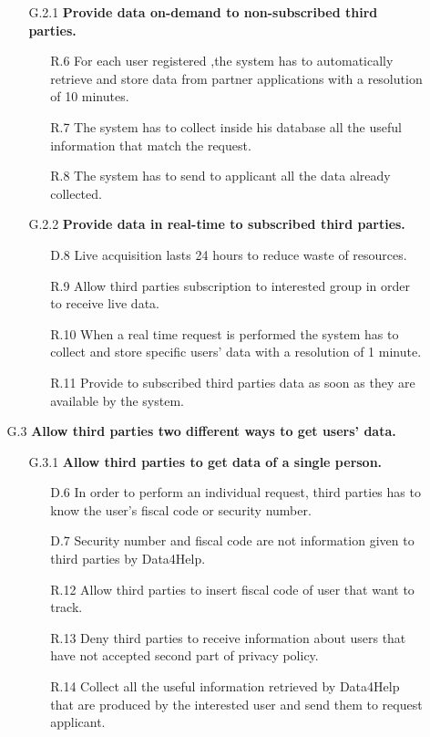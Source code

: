 \begin{enumerate}
\begin{enumerate}
		\begin{enumerate} 
		\item [G.2.1] \textbf{Provide data on-demand to non-subscribed third parties.}
		\begin{enumerate} 
		\item [R.6] For each user registered ,the system has to automatically retrieve and store data from partner applications with a resolution of 10 minutes.	
		\item [R.7] The system has to collect inside his database all the useful information that match the request.
		\item [R.8] The system has to send to applicant all the data already collected.
    	\end{enumerate}	
    	
    	\item [G.2.2] \textbf{Provide data in real-time to subscribed third parties.}
		\begin{enumerate}
		\item [D.8] Live acquisition lasts 24 hours to reduce waste of resources.
    	\item [R.9] Allow third parties subscription to interested group in order to receive live data.
    	\item [R.10] When a real time request is performed the system has to collect and store specific users' data with a resolution of 1 minute.
    	\item [R.11] Provide to subscribed third parties data as soon as they are available by the system.
    	\end{enumerate}
    	\end{enumerate}
    
	\item [G.3] \textbf{Allow third parties two different ways to get users' data.}
		\begin{enumerate}     
    	\item [G.3.1] \textbf{Allow third parties to get data of a single person.}
		\begin{enumerate}
		\item [D.6] In order to perform an individual request, third parties has to know the user's fiscal code or security number.
		\item [D.7] Security number and fiscal code are not information given to third parties by Data4Help.
    	\item [R.12] Allow third parties to insert fiscal code of user that want to track.
    	\item [R.13] Deny third parties to receive information about users that have not accepted second part of privacy policy.
    	\item [R.14] Collect all the useful information retrieved by Data4Help that are produced by the interested user and send them to request applicant.
    	\end{enumerate}
    

\end{enumerate}
\end{enumerate}
\end{enumerate}
